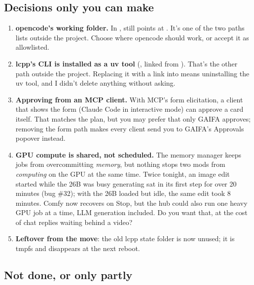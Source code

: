 \subsection*{Decisions only you can make}
\begin{enumerate}[leftmargin=*]
\item \textbf{opencode's working folder.} In ,  still points at . It's one of the two paths  lists outside the project. Choose where opencode should work, or accept it as allowlisted.
\item \textbf{lcpp's CLI is installed as a uv tool} (, linked from ). That's the other path outside the project. Replacing it with a link into  means uninstalling the uv tool, and I didn't delete anything without asking.
\item \textbf{Approving from an MCP client.} With MCP's form elicitation, a client that shows the form (Claude Code in interactive mode) can approve a card itself. That matches the plan, but you may prefer that only GAIFA approves; removing the form path makes every client send you to GAIFA's Approvals popover instead.
\item \textbf{GPU compute is shared, not scheduled.} The memory manager keeps jobs from overcommitting \emph{memory}, but nothing stops two mods from \emph{computing} on the GPU at the same time. Twice tonight, an image edit started while the 26B was busy generating sat in its first step for over 20 minutes (bug \#32); with the 26B loaded but idle, the same edit took 8 minutes. Comfy now recovers on Stop, but the hub could also run one heavy GPU job at a time, LLM generation included. Do you want that, at the cost of chat replies waiting behind a video?
\item \textbf{Leftover from the move}: the old lcpp state folder  is now unused; it is tmpfs and disappears at the next reboot.
\end{enumerate}

\subsection*{Not done, or only partly}


